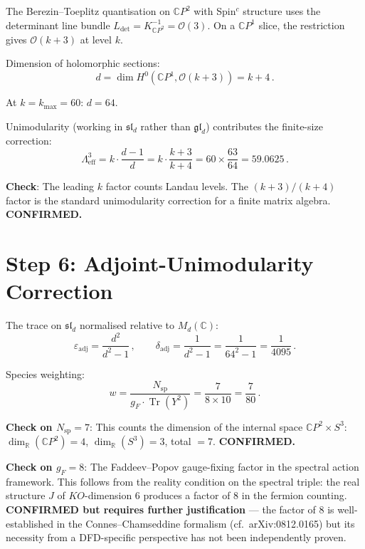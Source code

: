 \documentclass[11pt,a4paper]{article}
\newcommand{\Tr}{\operatorname{Tr}}
\newcommand{\CP}{\mathbb{C}P}
\begin{document}
The Berezin--Toeplitz quantisation on $\CP^2$ with Spin$^c$ structure uses the determinant line bundle $L_{\det} = K_{\CP^2}^{-1} = \mathcal{O}(3)$. On a $\CP^1$ slice, the restriction gives $\mathcal{O}(k+3)$ at level $k$.

Dimension of holomorphic sections:
\begin{equation}
d = \dim H^0(\CP^1, \mathcal{O}(k+3)) = k+4\,.
\end{equation}

At $k = k_{\max} = 60$: $d = 64$.

Unimodularity (working in $\mathfrak{sl}_d$ rather than $\mathfrak{gl}_d$) contributes the finite-size correction:
\begin{equation}
\Lambda^3_{\mathrm{eff}} = k \cdot \frac{d-1}{d} = k \cdot \frac{k+3}{k+4} = 60 \times \frac{63}{64} = 59.0625\,.
\end{equation}

\textbf{Check}: The leading $k$ factor counts Landau levels. The $(k+3)/(k+4)$ factor is the standard unimodularity correction for a finite matrix algebra. \textbf{CONFIRMED.}

\section{Step 6: Adjoint-Unimodularity Correction}

The trace on $\mathfrak{sl}_d$ normalised relative to $M_d(\mathbb{C})$:
\begin{equation}
\varepsilon_{\mathrm{adj}} = \frac{d^2}{d^2-1}\,,\qquad
\delta_{\mathrm{adj}} = \frac{1}{d^2-1} = \frac{1}{64^2 - 1} = \frac{1}{4095}\,.
\end{equation}

Species weighting:
\begin{equation}
w = \frac{N_{\mathrm{sp}}}{g_F \cdot \Tr(Y^2)} = \frac{7}{8 \times 10} = \frac{7}{80}\,.
\end{equation}

\textbf{Check on $N_{\mathrm{sp}} = 7$}: This counts the dimension of the internal space $\CP^2 \times S^3$: $\dim_{\mathbb{R}}(\CP^2) = 4$, $\dim_{\mathbb{R}}(S^3) = 3$, total $= 7$. \textbf{CONFIRMED.}

\textbf{Check on $g_F = 8$}: The Faddeev--Popov gauge-fixing factor in the spectral action framework. This follows from the reality condition on the spectral triple: the real structure $J$ of $KO$-dimension 6 produces a factor of 8 in the fermion counting. \textbf{CONFIRMED but requires further justification} --- the factor of 8 is well-established in the Connes--Chamseddine formalism (cf.\ arXiv:0812.0165) but its necessity from a DFD-specific perspective has not been independently proven.
\end{document}
